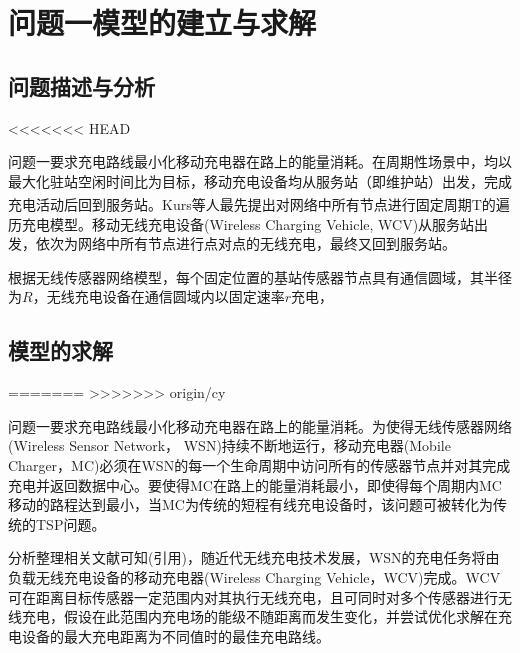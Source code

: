 \documentclass{whutmod}
\newcommand{\upcite}[1]{\textsuperscript{\cite{#1}}}
\begin{document}
	\section{问题一模型的建立与求解}
		\subsection{问题描述与分析}
<<<<<<< HEAD


			问题一要求充电路线最小化移动充电器在路上的能量消耗。在周期性场景中，均以最大化驻站空闲时间比为目标，移动充电设备均从服务站（即维护站）出发，完成充电活动后回到服务站。Kurs等人\upcite{4}最先提出对网络中所有节点进行固定周期T的遍历充电模型。移动无线充电设备(Wireless Charging Vehicle, WCV)从服务站出发，依次为网络中所有节点进行点对点的无线充电，最终又回到服务站。
			
			根据无线传感器网络模型，每个固定位置的基站传感器节点具有通信圆域，其半径为$R$，无线充电设备在通信圆域内以固定速率$r$充电，

		\subsection{模型的求解}


%			
%

=======
>>>>>>> origin/cy
		
			问题一要求充电路线最小化移动充电器在路上的能量消耗。为使得无线传感器网络
		(Wireless Sensor Network，	WSN)持续不断地运行，移动充电器(Mobile Charger，MC)必须在WSN的每一个生命周期中访问所有的传感器节点并对其完成充电并返回数据中心。要使得MC在路上的能量消耗最小，即使得每个周期内MC移动的路程达到最小，当MC为传统的短程有线充电设备时，该问题可被转化为传统的TSP问题。
		    
		    分析整理相关文献可知(引用)，随近代无线充电技术发展，WSN的充电任务将由负载无线充电设备的移动充电器(Wireless Charging Vehicle，WCV)完成。WCV可在距离目标传感器一定范围内对其执行无线充电，且可同时对多个传感器进行无线充电，假设在此范围内充电场的能级不随距离而发生变化，并尝试优化求解在充电设备的最大充电距离为不同值时的最佳充电路线。
		    
\end{document}
